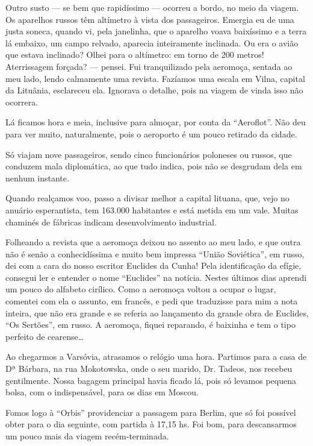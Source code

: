 Outro susto --- se bem que rapidíssimo --- ocorreu a bordo, no meio da viagem. Os aparelhos russos têm altímetro à vista dos passageiros. Emergia eu de uma justa soneca, quando vi, pela janelinha, que o aparelho voava baixíssimo e a terra lá embaixo, um campo relvado, aparecia inteiramente inclinada. Ou era o avião que estava inclinado? Olhei para o altímetro: em torno de 200 metros! Aterrissagem forçada? --- pensei. Fui tranquilizado pela aeromoça, sentada ao meu lado, lendo calmamente uma revista. Fazíamos uma escala em Vilna, capital da Lituânia, esclareceu ela. Ignorava o detalhe, pois na viagem de vinda isso não ocorrera.

Lá ficamos hora e meia, inclusive para almoçar, por conta da ``Aeroflot''. Não deu para ver muito, naturalmente, pois o aeroporto é um pouco retirado da cidade.

Só viajam nove passageiros, sendo cinco funcionários poloneses ou russos, que conduzem mala diplomática, ao que tudo indica, pois não se desgrudam dela em nenhum instante.

Quando realçamos voo, passo a divisar melhor a capital lituana, que, vejo no anuário esperantista, tem 163.000 habitantes e está metida em um vale. Muitas chaminés de fábricas indicam desenvolvimento industrial.

Folheando a revista que a aeromoça deixou no assento ao meu lado, e que outra não é senão a conhecidíssima e muito bem impressa ``União Soviética'', em russo, dei com a cara do nosso escritor Euclides da Cunha! Pela identificação da efígie, consegui ler e entender o nome ``Euclides'' na notícia. Nestes últimos dias aprendi um pouco do alfabeto cirílico. Como a aeromoça voltou a ocupar o lugar, comentei com ela o assunto, em francês, e pedi que traduzisse para mim a nota inteira, que não era grande e se referia ao lançamento da grande obra de Euclides, ``Os Sertões'', em russo. A aeromoça, fiquei reparando, é baixinha e tem o tipo perfeito de cearense\ldots

Ao chegarmos a Varsóvia, atrasamos o relógio uma hora. Partimos para a casa de Dª Bárbara, na rua Mokotowska, onde o seu marido, Dr. Tadeos, nos recebeu gentilmente. Nossa bagagem principal havia ficado lá, pois só levamos pequena bolsa, com o indispensável, para os dias em Moscou.

Fomos logo à ``Orbis'' providenciar a passagem para Berlim, que só foi possível obter para o dia seguinte, com partida à 17,15 hs. Foi bom, para descansarmos um pouco mais da viagem recém-terminada.

